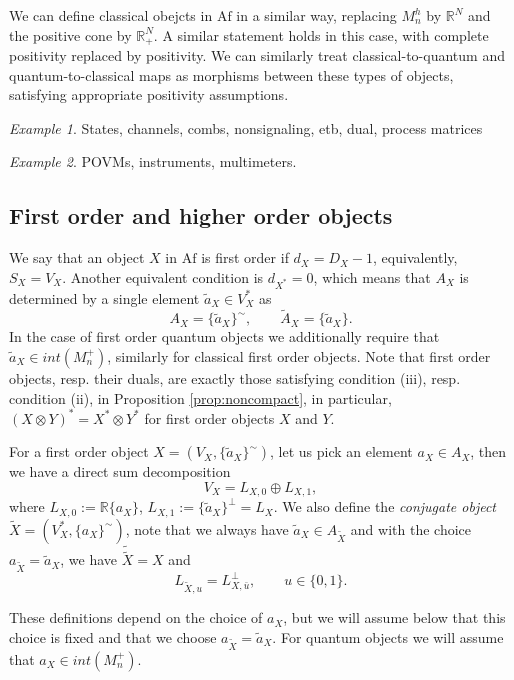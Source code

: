 \documentclass[12pt]{article}
\theoremstyle{definition}
\theoremstyle{remark}
\newtheorem{exm}{Example}
\def \Af{\mathrm{Af}}
\begin{document}
We can define classical obejcts in $\Af$ in a similar way, replacing $M_n^h$ by $\mathbb
R^N$ and the positive cone by $\mathbb R_+^N$. A similar statement holds in this case,
with complete positivity replaced by positivity. We can similarly treat
classical-to-quantum and quantum-to-classical maps as morphisms between these types of
objects, satisfying appropriate positivity assumptions.

\begin{exm}\label{exm:quantum_maps} States, channels, combs, nonsignaling, etb, dual, process
matrices

\end{exm}

\begin{exm}\label{exm:qccq} POVMs, instruments, multimeters.


\end{exm}


\subsection{First order and higher order objects}


We say that an object $X$ in $\Af$ is first order if $d_X=D_X-1$, equivalently, $S_X=V_X$.
Another equivalent condition is $d_{X^*}=0$, which means that $A_X$ is determined by a
single element $\tilde a_X\in V_X^*$ as 
\[
A_X=\{\tilde a_X\}^\sim,\qquad \tilde A_X=\{\tilde a_X\}.
\]
In the case of first order quantum objects we additionally require that $\tilde a_X\in
int(M_n^+)$, similarly for classical first order objects.
Note that first order objects, resp. their duals, are exactly those satisfying
condition (iii), resp. condition (ii), in Proposition \ref{prop:noncompact}, in
particular, $(X\otimes Y)^*=X^*\otimes Y^*$ for first order objects $X$ and $Y$.

For a first order object $X=(V_X, \{\tilde a_X\}^\sim)$, let us pick an element $a_X\in
A_X$, then we have a direct sum decomposition
\[
V_X=L_{X,0}\oplus L_{X,1},
\]
where $L_{X,0}:= \mathbb R\{a_X\}$, $L_{X,1}:=\{\tilde a_X\}^\perp=L_X$.
We also define the {\em conjugate object} $\tilde X=(V_X^*,\{a_X\}^\sim)$, note that we always
have $\tilde a_X\in A_{\tilde X}$ and with the choice $a_{\tilde X}=\tilde a_X$, we have
$\tilde{\tilde X}=X$ and 
\begin{equation}\label{eq:complement}
L_{\tilde X,u}=L_{X,\bar u}^\perp,\qquad u\in \{0,1\}.
\end{equation}

These  definitions depend on the choice of $a_X$, but we will assume below that this
choice is fixed and that we choose $a_{\tilde X}=\tilde a_X$. For quantum objects we will
assume that $a_X\in int(M_n^+)$.
\end{document}
